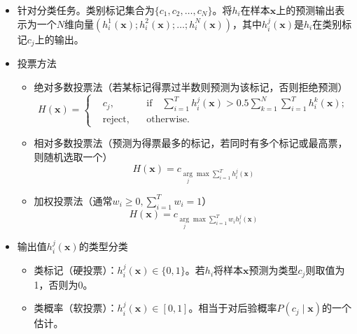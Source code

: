 \documentclass{ctexart}
\begin{document}
	 					\begin{itemize}
	 						\item 针对分类任务。类别标记集合为$\{c_1,c_2,\dots,c_N\}$。将$h_i$在样本$\bm{x}$上的预测输出表示为一个$N$维向量$(h_i^1(\bm{x});h_i^2(\bm{x});\dots;h_i^N(\bm{x}))$，其中$h_i^j(\bm{x})$是$h_i$在类别标记$c_j$上的输出。
	 					
		 					\item 投票方法\begin{itemize}
		 						\item 绝对多数投票法（若某标记得票过半数则预测为该标记，否则拒绝预测）
		 						\[H(\bm{x})=\left\{\begin{aligned}
		 						&c_j, && \mathrm{if}\quad\sum_{i=1}^{T}h_i^j(\bm{x})>0.5\sum_{k=1}^{N}\sum_{i=1}^{T}h_i^k(\bm{x});\\
		 						&\mathrm{reject,} && \mathrm{otherwise.}
		 						\end{aligned}\right.\]
		 						\item 相对多数投票法（预测为得票最多的标记，若同时有多个标记或最高票，则随机选取一个）
		 						\[H(\bm{x})=c_{\arg\limits_{j}\max\sum_{i=1}^{T}h_i^j(\bm{x})}\]
		 						\item 加权投票法（通常$w_i\ge0,\sum_{i=1}^{T}w_i=1$）\[H(\bm{x})=c_{\arg\limits_{j}\max\sum_{i=1}^{T}w_ih_i^j(\bm{x})}\]
		 						\end{itemize}
	 						\item 输出值$h_i^j(\bm{x})$的类型分类\begin{itemize}
	 							\item 类标记（硬投票）：$h_i^j(\bm{x})\in\{0,1\}$。若$h_i$将样本$\bm{x}$预测为类型$c_j$则取值为1，否则为0。
	 							\item 类概率（软投票）：$h_i^j(\bm{x})\in[0,1]$。相当于对后验概率$P(c_j\mid\bm{x})$的一个估计。
	 						\end{itemize}
 						\end{itemize}
\end{document}
